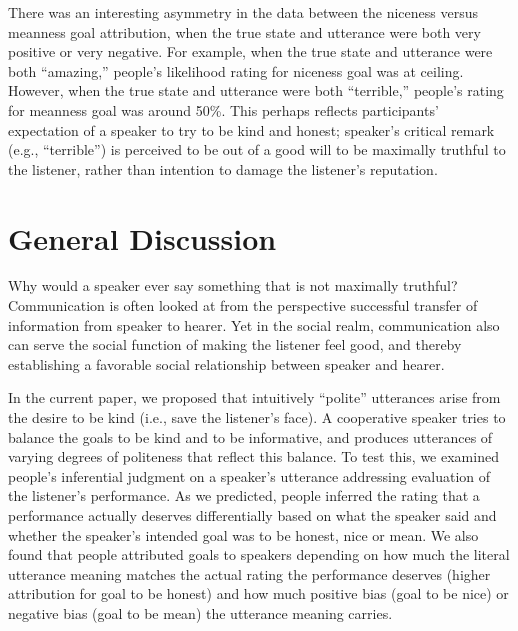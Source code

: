 \documentclass[10pt,letterpaper]{article}
\newcommand{\ndg}[1]{\textcolor{Green}{[ndg: #1]}}
\newcommand{\mht}[1]{\textcolor{DarkOrange}{[mht: #1]}}
\begin{document}
There was an interesting asymmetry in the data between the niceness versus meanness goal attribution, 
when the true state and utterance were both very positive or very negative. 
For example, when the true state and utterance were both ``amazing,'' people's likelihood rating for niceness goal was at ceiling. 
However, when the true state and utterance were both ``terrible,'' people's rating for meanness goal was around 50\%. 
This perhaps reflects participants' expectation of a speaker to try to be kind and honest; 
speaker's critical remark (e.g., ``terrible'') is perceived to be out of a good will to be maximally truthful to the listener, 
rather than intention to damage the listener's reputation. 



\section{General Discussion}


Why would a speaker ever say something that is not maximally truthful? 
Communication is often looked at from the perspective successful transfer of information from speaker to hearer. 
Yet in the social realm, communication also can serve the social function of making the listener feel good, and thereby establishing a favorable social relationship between speaker and hearer.

In the current paper, we proposed that intuitively ``polite'' utterances arise from the desire to be kind (i.e., save the listener's face). A cooperative speaker tries to balance the goals to be kind and to be informative, and produces utterances of varying degrees of politeness that reflect this balance.
To test this, we examined people's inferential judgment on a speaker's utterance addressing evaluation of the listener's performance. 
As we predicted, people inferred the rating that a performance actually deserves
differentially based on what the speaker said and whether the speaker's intended goal was to be honest, nice or mean. 
We also found that people attributed goals to speakers depending on 
how much the literal utterance meaning matches the actual rating the performance deserves (higher attribution for goal to be honest) 
and how much positive bias (goal to be nice) or negative bias (goal to be mean) the utterance meaning carries. 
\end{document}
